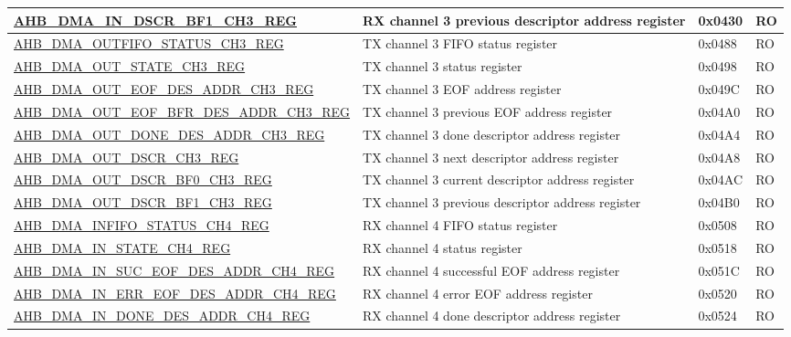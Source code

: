 \begin{longtable}{ | l | p{10cm} | p{1.3cm} | l | }
\hyperref[regdesc:AHBDMAINDSCRBF1CHNREG]{AHB\_DMA\_IN\_DSCR\_BF1\_CH3\_REG} & RX channel 3 previous descriptor address register & 0x0430 & RO \\ \hline
\hyperref[regdesc:AHBDMAOUTFIFOSTATUSCHNREG]{AHB\_DMA\_OUTFIFO\_STATUS\_CH3\_REG} & TX channel 3 FIFO status register & 0x0488 & RO \\ \hline
\hyperref[regdesc:AHBDMAOUTSTATECHNREG]{AHB\_DMA\_OUT\_STATE\_CH3\_REG} & TX channel 3 status register & 0x0498 & RO \\ \hline
\hyperref[regdesc:AHBDMAOUTEOFDESADDRCHNREG]{AHB\_DMA\_OUT\_EOF\_DES\_ADDR\_CH3\_REG} & TX channel 3 EOF address register & 0x049C & RO \\ \hline
\hyperref[regdesc:AHBDMAOUTEOFBFRDESADDRCHNREG]{AHB\_DMA\_OUT\_EOF\_BFR\_DES\_ADDR\_CH3\_REG} & TX channel 3 previous EOF address register & 0x04A0 & RO \\ \hline
\hyperref[regdesc:AHBDMAOUTDONEDESADDRCHNREG]{AHB\_DMA\_OUT\_DONE\_DES\_ADDR\_CH3\_REG} & TX channel 3 done descriptor address register & 0x04A4 & RO \\ \hline
\hyperref[regdesc:AHBDMAOUTDSCRCHNREG]{AHB\_DMA\_OUT\_DSCR\_CH3\_REG} & TX channel 3 next descriptor address register & 0x04A8 & RO \\ \hline
\hyperref[regdesc:AHBDMAOUTDSCRBF0CHNREG]{AHB\_DMA\_OUT\_DSCR\_BF0\_CH3\_REG} & TX channel 3 current descriptor address register & 0x04AC & RO \\ \hline
\hyperref[regdesc:AHBDMAOUTDSCRBF1CHNREG]{AHB\_DMA\_OUT\_DSCR\_BF1\_CH3\_REG} & TX channel 3 previous descriptor address register & 0x04B0 & RO \\ \hline
\hyperref[regdesc:AHBDMAINFIFOSTATUSCHNREG]{AHB\_DMA\_INFIFO\_STATUS\_CH4\_REG} & RX channel 4 FIFO status register & 0x0508 & RO \\ \hline
\hyperref[regdesc:AHBDMAINSTATECHNREG]{AHB\_DMA\_IN\_STATE\_CH4\_REG} & RX channel 4 status register & 0x0518 & RO \\ \hline
\hyperref[regdesc:AHBDMAINSUCEOFDESADDRCHNREG]{AHB\_DMA\_IN\_SUC\_EOF\_DES\_ADDR\_CH4\_REG} & RX channel 4 successful EOF address register & 0x051C & RO \\ \hline
\hyperref[regdesc:AHBDMAINERREOFDESADDRCHNREG]{AHB\_DMA\_IN\_ERR\_EOF\_DES\_ADDR\_CH4\_REG} & RX channel 4 error EOF address register & 0x0520 & RO \\ \hline
\hyperref[regdesc:AHBDMAINDONEDESADDRCHNREG]{AHB\_DMA\_IN\_DONE\_DES\_ADDR\_CH4\_REG} & RX channel 4 done descriptor address register & 0x0524 & RO \\ \hline

\end{longtable}
